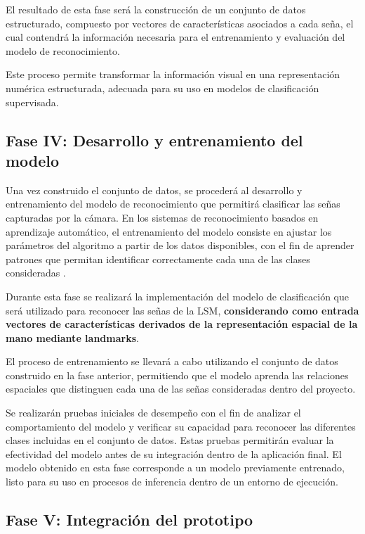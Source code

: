 	El resultado de esta fase será la construcción de un conjunto de datos
	estructurado, compuesto por vectores de características asociados a cada seña,
	el cual contendrá la información necesaria para el entrenamiento y evaluación
	del modelo de reconocimiento.
	
	Este proceso permite transformar la información visual en una representación numérica estructurada, adecuada para su uso en modelos de clasificación supervisada.
	
	\subsection{Fase IV: Desarrollo y entrenamiento del modelo}
	
	Una vez construido el conjunto de datos, se procederá al desarrollo y
	entrenamiento del modelo de reconocimiento que permitirá clasificar las
	señas capturadas por la cámara. En los sistemas de reconocimiento basados en
	aprendizaje automático, el entrenamiento del modelo consiste en ajustar los
	parámetros del algoritmo a partir de los datos disponibles, con el fin
	de aprender patrones que permitan identificar correctamente cada una de las
	clases consideradas \cite{goodfellow2016,geron2019}.
	
	Durante esta fase se realizará la implementación del modelo de clasificación
	que será utilizado para reconocer las señas de la LSM, \textbf{considerando como entrada vectores de características derivados de la representación espacial de la mano mediante landmarks}.
	
	El proceso de entrenamiento se llevará a cabo utilizando el conjunto de datos
	construido en la fase anterior, permitiendo que el modelo aprenda las
	relaciones espaciales que distinguen cada una de las señas consideradas dentro del
	proyecto.
	
	Se realizarán pruebas iniciales de desempeño con el fin de analizar el
	comportamiento del modelo y verificar su capacidad para reconocer las
	diferentes clases incluidas en el conjunto de datos. Estas pruebas permitirán
	evaluar la efectividad del modelo antes de su integración dentro de la
	aplicación final. El modelo obtenido en esta fase corresponde a un modelo previamente entrenado, listo para su uso en procesos de inferencia dentro de un entorno de ejecución.
	
	\subsection{Fase V: Integración del prototipo}
	
